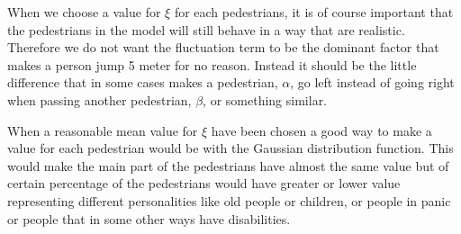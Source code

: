 When we choose a value for $\xi$ for each pedestrians, it is of course important that the 
pedestrians in the model will still behave in a way that are realistic. Therefore we do not 
want the fluctuation term to be the dominant factor that makes a person jump 5 meter for no reason. 
Instead it should be the little difference that in some cases makes a pedestrian, $\alpha$, go left 
instead of going right when passing another pedestrian, $\beta$, or something similar.  

When a reasonable mean value for $\xi$ have been chosen a good way to make a value for each 
pedestrian would be with the Gaussian distribution function. This would make the main part of 
the pedestrians have almost the same value but of certain percentage of the pedestrians would 
have greater or lower value representing different personalities like old people or children, 
or people in panic or people that in some other ways have disabilities. 
